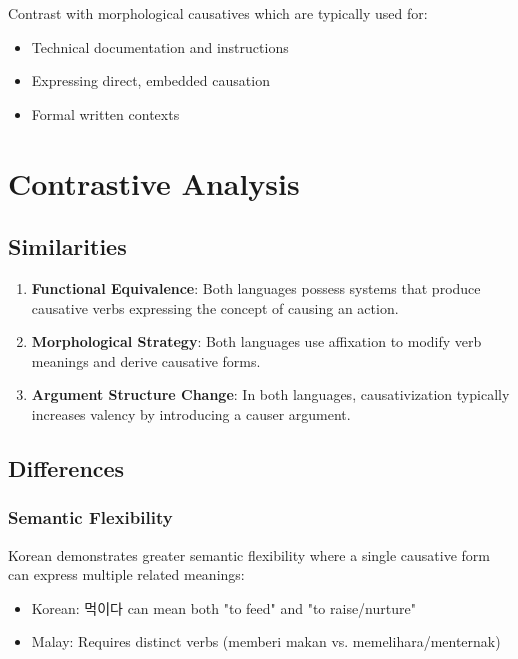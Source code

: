 \documentclass[12pt,a4paper]{article}
\begin{document}
Contrast with morphological causatives which are typically used for:
\begin{itemize}
\item Technical documentation and instructions
\item Expressing direct, embedded causation
\item Formal written contexts
\end{itemize}

\section{Contrastive Analysis}

\subsection{Similarities}

\begin{enumerate}
\item \textbf{Functional Equivalence}: Both languages possess systems that produce causative verbs expressing the concept of causing an action.

\item \textbf{Morphological Strategy}: Both languages use affixation to modify verb meanings and derive causative forms.

\item \textbf{Argument Structure Change}: In both languages, causativization typically increases valency by introducing a causer argument.
\end{enumerate}

\subsection{Differences}

\subsubsection{Semantic Flexibility}
Korean demonstrates greater semantic flexibility where a single causative form can express multiple related meanings:
\begin{itemize}
\item Korean: 먹이다 can mean both "to feed" and "to raise/nurture"
\item Malay: Requires distinct verbs (memberi makan vs. memelihara/menternak)
\end{itemize}
\end{document}
